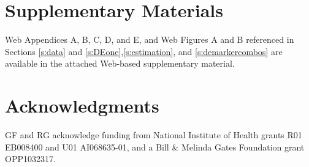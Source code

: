 \documentclass[useAMS,referee,usenatbib]{biom}
\begin{document}
\backmatter

\section*{Supplementary Materials}

Web Appendices A, B, C, D, and E, and Web Figures A and B referenced in Sections \ref{s:data} and \ref{s:DEone},\ref{s:estimation},  and \ref{s:demarkercombos} are available in the attached Web-based supplementary material.\vspace*{-8pt}

\section*{Acknowledgments}
GF and RG acknowledge funding from National Institute of Health grants R01 EB008400 and U01 AI068635-01, and a Bill \& Melinda Gates Foundation grant OPP1032317. 

\end{document}
